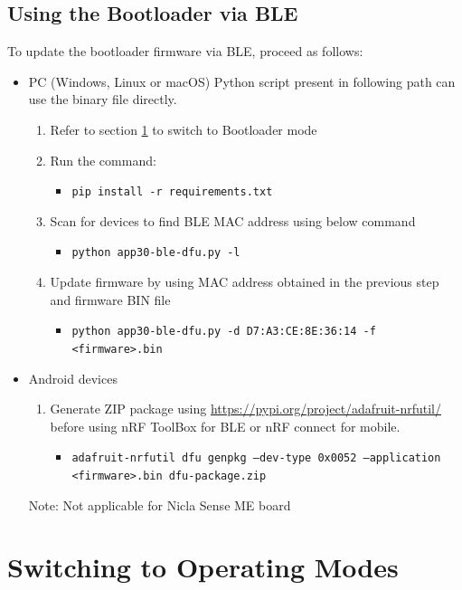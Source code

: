 \documentclass[11pt,headings=small]{scrartcl}
\begin{document}
\subsection{Using the Bootloader via BLE}
To update the bootloader firmware via BLE, proceed as follows:
\begin{itemize}
	\item PC (Windows, Linux or macOS)
	\newline Python script present in following path  can use the binary file directly.
	\begin{enumerate}[label=\roman*.]
		\item Refer to section \ref{SwitchModes} to switch to Bootloader mode
		\item Run the command:
		\begin{itemize}
			\item \texttt{pip install -r requirements.txt}
		\end{itemize} 
		\item Scan for devices to find BLE MAC address using below command
		\begin{itemize}
			\item \texttt{python app30-ble-dfu.py -l}
		\end{itemize} 
		\item Update firmware by using MAC address obtained in the previous step and firmware BIN file
		\begin{itemize}
			\item \texttt{python app30-ble-dfu.py -d D7:A3:CE:8E:36:14 -f <firmware>.bin}
		\end{itemize}
	\end{enumerate}
	\item Android devices
	\begin{enumerate}[label=\roman*.]
		\item Generate ZIP package using \url{https://pypi.org/project/adafruit-nrfutil/} before using nRF ToolBox for BLE or nRF connect for mobile.
		\begin{itemize}
			\item \texttt{adafruit-nrfutil dfu genpkg --dev-type 0x0052 --application <firmware>.bin dfu-package.zip}
		\end{itemize} 
	\end{enumerate}
Note: Not applicable for Nicla Sense ME board
\end{itemize}

\newpage

\section{Switching to Operating Modes}\label{SwitchModes}
\end{document}
